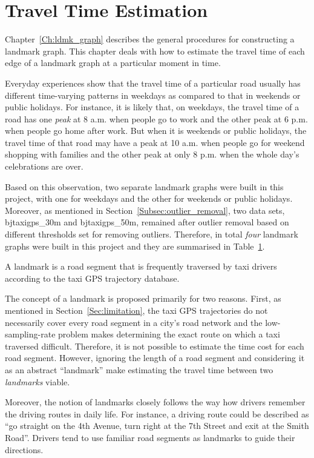 \chapter{Travel Time Estimation}
Chapter~\ref{Ch:ldmk_graph} describes the general procedures for constructing a landmark graph. This chapter deals with how to estimate the travel time of each edge of a landmark graph at a particular moment in time. 

Everyday experiences show that the travel time of a particular road usually has different time-varying patterns in weekdays as compared to that in weekends or public holidays. For instance, it is likely that, on weekdays, the travel time of a road has one \emph{peak} at 8 a.m. when people go to work and the other peak at 6 p.m. when people go home after work. But when it is weekends or public holidays, the travel time of that road may have a peak at 10 a.m. when people go for weekend shopping with families and the other peak at only 8 p.m. when the whole day's celebrations are over. 

Based on this observation, two separate landmark graphs were built in this project, with one for weekdays and the other for weekends or public holidays. Moreover, as mentioned in Section~\ref{Subsec:outlier_removal}, 
two data sets, bjtaxigps\_30m and bjtaxigps\_50m, remained after outlier removal based on different thresholds set for removing outliers. Therefore, in total \emph{four} landmark graphs were built in this project and they are summarised in Table~\ref{}.

\begin{defn}\label{Def:ldmk}
A landmark is a road segment that is frequently traversed by taxi drivers according to the taxi GPS trajectory database. \cite{TDR10}
\end{defn}

The concept of a landmark is proposed primarily for two reasons. First, as mentioned in Section~\ref{Sec:limitation}, the taxi GPS trajectories do not necessarily cover every road segment in a city's road network and the low-sampling-rate problem makes determining the exact route on which a taxi traversed difficult. Therefore, it is not possible to estimate the time cost for each road segment. However, ignoring the length of a road segment and considering it as an abstract ``landmark'' make estimating the travel time between two \emph{landmarks} viable. 

Moreover, the notion of landmarks closely follows the way how drivers remember the driving routes in daily life\cite{TDR10}. For instance, a driving route could be described as ``go straight on the 4th Avenue, turn right at the 7th Street and exit at the Smith Road''. Drivers tend to use familiar road segments as landmarks to guide their directions.

